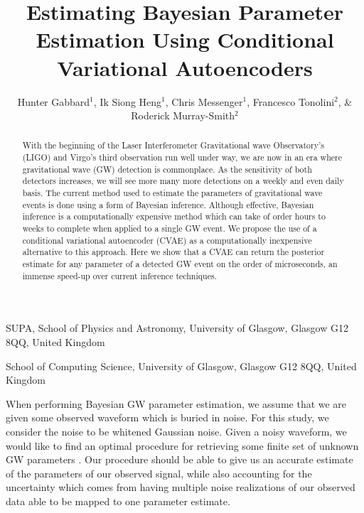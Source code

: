 \documentclass{nature}
\title{Estimating Bayesian Parameter Estimation Using Conditional Variational Autoencoders}
\author{Hunter Gabbard$^{1}$, Ik Siong Heng$^1$, Chris Messenger$^1$, Francesco Tonolini$^2$, \& Roderick Murray-Smith$^2$}
\begin{document}
\maketitle

\begin{affiliations}
 \item SUPA, School of Physics and Astronomy, University of Glasgow, Glasgow G12 8QQ, United Kingdom
 \item School of Computing Science, University of Glasgow, Glasgow G12 8QQ, United Kingdom
\end{affiliations}

\begin{abstract}
With the beginning of the Laser Interferometer Gravitational wave Observatory's (LIGO) and Virgo's third observation run well under way, we are now in an era where gravitational wave (GW) detection is commonplace. As the sensitivity of both detectors increases, we will see more many more detections on a weekly and even daily basis.  The current method used to estimate the parameters of gravitational wave events is done using a form of Bayesian inference. Although effective, Bayesian inference is a computationally expensive method which can take of order hours to weeks to complete when applied to a single GW event. We propose the use of a conditional variational autoencoder (CVAE) as a computationally inexpensive alternative to this approach. Here we show that a CVAE can return the posterior estimate for any parameter of a detected GW event on the order of microseconds, an immense speed-up over current inference techniques.

\end{abstract}

When performing Bayesian GW parameter estimation, we assume that we are given 
some observed waveform which is buried in noise. For this study, we consider 
the noise to be whitened Gaussian noise. Given a noisy waveform, we would like 
to find an optimal procedure for retrieving some finite set of unknown GW parameters 
\cite{Jaranowski2012}. Our procedure should be able to give us an accurate estimate 
of the parameters of our observed signal, while also accounting for the uncertainty 
which comes from having multiple noise realizations of our observed data able to 
be mapped to one parameter estimate.
\end{document}
